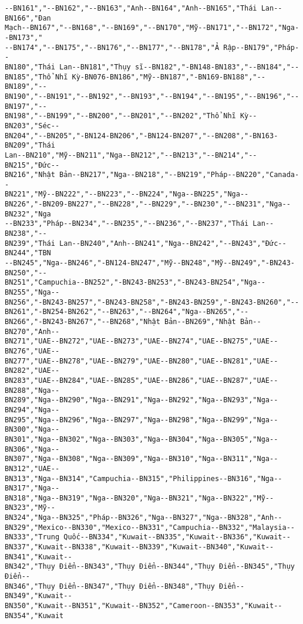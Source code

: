 \documentclass[11pt]{article}
\begin{document}
\begin{tcolorbox}[breakable, size=fbox, boxrule=.5pt, pad at break*=1mm, opacityfill=0]
\begin{Verbatim}[commandchars=\\\{\}]
--BN161","--BN162","--BN163","Anh--BN164","Anh--BN165","Thái Lan--BN166","Đan
Mạch--BN167","--BN168","--BN169","--BN170","Mỹ--BN171","--BN172","Nga--BN173","
--BN174","--BN175","--BN176","--BN177","--BN178","Ả Rập--BN179","Pháp--
BN180","Thái Lan--BN181","Thụy sĩ--BN182","-BN148-BN183","--BN184","--
BN185","Thổ Nhĩ Kỳ-BN076-BN186","Mỹ--BN187","-BN169-BN188","--BN189","--
BN190","--BN191","--BN192","--BN193","--BN194","--BN195","--BN196","--BN197","--
BN198","--BN199","--BN200","--BN201","--BN202","Thổ Nhĩ Kỳ--BN203","Séc--
BN204","--BN205","-BN124-BN206","-BN124-BN207","--BN208","-BN163-BN209","Thái
Lan--BN210","Mỹ--BN211","Nga--BN212","--BN213","--BN214","--BN215","Đức--
BN216","Nhật Bản--BN217","Nga--BN218","--BN219","Pháp--BN220","Canada--
BN221","Mỹ--BN222","--BN223","--BN224","Nga--BN225","Nga--
BN226","-BN209-BN227","--BN228","--BN229","--BN230","--BN231","Nga--BN232","Nga
--BN233","Pháp--BN234","--BN235","--BN236","--BN237","Thái Lan--BN238","--
BN239","Thái Lan--BN240","Anh--BN241","Nga--BN242","--BN243","Đức--BN244","TBN
--BN245","Nga--BN246","-BN124-BN247","Mỹ--BN248","Mỹ--BN249","-BN243-BN250","--
BN251","Campuchia--BN252","-BN243-BN253","-BN243-BN254","Nga--BN255","Nga--
BN256","-BN243-BN257","-BN243-BN258","-BN243-BN259","-BN243-BN260","--
BN261","-BN254-BN262","--BN263","--BN264","Nga--BN265","--
BN266","-BN243-BN267","--BN268","Nhật Bản--BN269","Nhật Bản--BN270","Anh--
BN271","UAE--BN272","UAE--BN273","UAE--BN274","UAE--BN275","UAE--BN276","UAE--
BN277","UAE--BN278","UAE--BN279","UAE--BN280","UAE--BN281","UAE--BN282","UAE--
BN283","UAE--BN284","UAE--BN285","UAE--BN286","UAE--BN287","UAE--BN288","Nga--
BN289","Nga--BN290","Nga--BN291","Nga--BN292","Nga--BN293","Nga--BN294","Nga--
BN295","Nga--BN296","Nga--BN297","Nga--BN298","Nga--BN299","Nga--BN300","Nga--
BN301","Nga--BN302","Nga--BN303","Nga--BN304","Nga--BN305","Nga--BN306","Nga--
BN307","Nga--BN308","Nga--BN309","Nga--BN310","Nga--BN311","Nga--BN312","UAE--
BN313","Nga--BN314","Campuchia--BN315","Philippines--BN316","Nga--BN317","Nga--
BN318","Nga--BN319","Nga--BN320","Nga--BN321","Nga--BN322","Mỹ--BN323","Mỹ--
BN324","Nga--BN325","Pháp--BN326","Nga--BN327","Nga--BN328","Anh--
BN329","Mexico--BN330","Mexico--BN331","Campuchia--BN332","Malaysia--
BN333","Trung Quốc--BN334","Kuwait--BN335","Kuwait--BN336","Kuwait--
BN337","Kuwait--BN338","Kuwait--BN339","Kuwait--BN340","Kuwait--BN341","Kuwait--
BN342","Thụy Điển--BN343","Thụy Điển--BN344","Thụy Điển--BN345","Thụy Điển--
BN346","Thụy Điển--BN347","Thụy Điển--BN348","Thụy Điển--BN349","Kuwait--
BN350","Kuwait--BN351","Kuwait--BN352","Cameroon--BN353","Kuwait--BN354","Kuwait

\end{Verbatim}
\end{tcolorbox}
\end{document}
